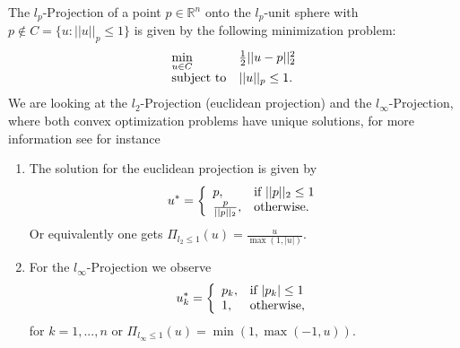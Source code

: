     \begin{example}
    \label{ex:projection_operator}

        The $l_{p}$-Projection of a point $p \in \mathbb{R}^{n}$ onto the $l_{p}$-unit sphere with $p \notin C = \{u : ||u||_{p} \le 1 \}$ is given by the following minimization problem:
            \begin{equation}
                \begin{array}{l l}
                    \min\limits_{u \in C} &  \frac{1}{2} ||u - p||_{2}^{2} \\
                    \textnormal{subject to} & ||u||_{p} \le 1.
                \end{array}
                \notag
            \end{equation}
        We are looking at the $l_{2}$-Projection (euclidean projection) and the $l_{\infty}$-Projection, where both convex optimization problems have unique solutions, for more information see for instance %
        \begin{enumerate}
            \item The solution for the euclidean projection is given by
                \begin{equation}
                    u^{\ast} =
                    \left\{
                        \begin{array}{l l}
                           p, & \textnormal{if}\,\, ||p||_{2} \le 1 \\
                           \frac{p}{||p||_{2}}, & \textnormal{otherwise.}
                        \end{array}
                    \right.
                    \notag
                \end{equation}
            Or equivalently one gets $\Pi_{l_{2} \le 1}(u) = \frac{u}{\max(1, |u|)}$.
            \item For the $l_{\infty}$-Projection we observe
                \begin{equation}
                    u_{k}^{\ast} =
                    \left\{
                        \begin{array}{l l}
                           p_{k}, & \textnormal{if}\,\, |p_{k}| \le 1 \\
                           1, & \textnormal{otherwise,}
                        \end{array}
                    \right.
                    \notag
                \end{equation}
            for $k = 1, ..., n$ or $\Pi_{l_{\infty} \le 1}(u) = \min(1, \max(-1, u))$.
        \end{enumerate}

    \end{example}

